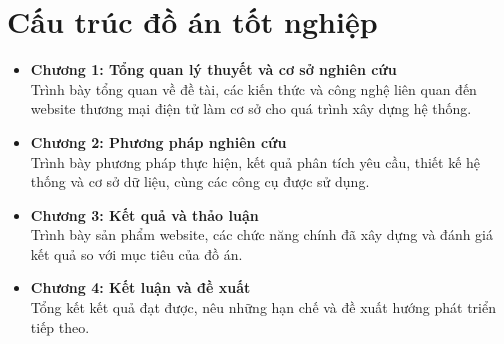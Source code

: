 \section{Cấu trúc đồ án tốt nghiệp}
\begin{itemize}
    \item \textbf{Chương 1: Tổng quan lý thuyết và cơ sở nghiên cứu} \\
    Trình bày tổng quan về đề tài, các kiến thức và công nghệ liên quan đến website thương mại điện tử làm cơ sở cho quá trình xây dựng hệ thống.
    
    \item \textbf{Chương 2: Phương pháp nghiên cứu} \\
    Trình bày phương pháp thực hiện, kết quả phân tích yêu cầu, thiết kế hệ thống và cơ sở dữ liệu, cùng các công cụ được sử dụng.
    
    \item \textbf{Chương 3: Kết quả và thảo luận} \\
    Trình bày sản phẩm website, các chức năng chính đã xây dựng và đánh giá kết quả so với mục tiêu của đồ án.
    
    \item \textbf{Chương 4: Kết luận và đề xuất} \\
    Tổng kết kết quả đạt được, nêu những hạn chế và đề xuất hướng phát triển tiếp theo.
\end{itemize}